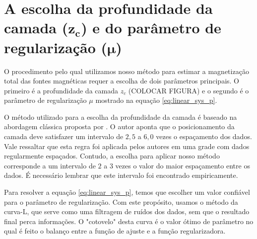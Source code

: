 %
%

\section{A escolha da profundidade da camada ($\mathbf{z_{c}}$) e do parâmetro de regularização ($\mathbf{\mu}$)}

O procedimento pelo qual utilizamos nosso método para estimar a magnetização total das fontes magnéticas requer a escolha de dois parâmetros principais. O primeiro é a profundidade da camada $z_c$ (COLOCAR FIGURA) e o segundo é o parâmetro de regularização $\mu$ mostrado na equação \ref{eq:linear_sys_p}. 

O método utilizado para a escolha da profundidade da camada é baseado na abordagem clássica proposta por \cite{dampney1969}. O autor aponta que o posicionamento da camada deve satisfazer um intervalo de $2,5$ a $6,0$ vezes o espaçamento dos dados. Vale ressaltar que esta regra foi aplicada pelos autores em uma grade com dados regularmente espaçados. Contudo, a escolha para aplicar nosso método corresponde a um intervalo de $2$ a $3$ vezes o valor do maior espaçamento entre os dados. É necessário lembrar que este intervalo foi encontrado empiricamente. 

Para resolver a equação \ref{eq:linear_sys_p}, temos que escolher um valor confiável para o parâmetro de regularização. Com este propósito, usamos o método da curva-L, que serve como uma filtragem de ruídos dos dados, sem que o resultado final perca informações. O "cotovelo" desta curva é o valor ótimo de parâmetro no qual é feito o balanço entre a função de ajuste e a função regularizadora. 

